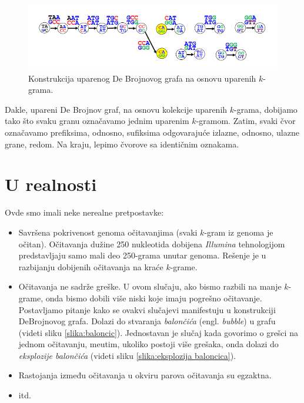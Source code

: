 \begin{figure}[h]
	\centering
	\includegraphics[width=1\textwidth]{poglavlja/3/slike/upareno_lepljenje2.png}
	\caption{Konstrukcija uparenog De Brojnovog grafa na osnovu uparenih $k$-grama.}
	\label{slika:uparenoLepljenje2}
\end{figure} 

Dakle, upareni De Brojnov graf, na osnovu kolekcije uparenih $k$-grama, dobijamo tako što svaku granu označavamo jednim uparenim $k$-gramom. Zatim, svaki čvor označavamo prefiksima, odnosno, sufiksima odgovaraju\'ce izlazne, odnosno, ulazne grane, redom. Na kraju, lepimo čvorove sa identičnim oznakama.

\section{U realnosti}

Ovde smo imali neke nerealne pretpostavke:

\begin{itemize}
	\item Savršena pokrivenost genoma očitavanjima (svaki $k$-gram iz genoma je očitan). Očitavanja dužine 250 nukleotida dobijena \emph{Illumina} tehnologijom predstavljaju samo mali deo 250-grama unutar genoma. Rešenje je u razbijanju dobijenih očitavanja na kraće $k$-grame.
	
	\item Očitavanja ne sadrže greške. U ovom slu\v caju, ako bismo razbili na manje $k$-grame, onda bismo dobili vi\v se niski koje imaju pogre\v sno o\v citavanje. Postavljamo pitanje kako se ovakvi slu\v cajevi manifestuju u konstrukciji DeBrojnovog grafa. Dolazi do stvaranja \emph{balon\v ci\'ca} (engl. \emph{bubble}) u grafu (videti sliku \ref{slika:baloncic}). Jednostavan je slu\v caj kada govorimo o gre\v sci na jednom o\v citavanju, me\dj utim, ukoliko postoji vi\v se gre\v saka, onda dolazi do \emph{eksplozije balon\v ci\'ca} (videti sliku \ref{slika:eksplozija baloncica}).
	
	\item Rastojanja između očitavanja u okviru parova očitavanja su egzaktna.
	
	\item itd.
\end{itemize}

